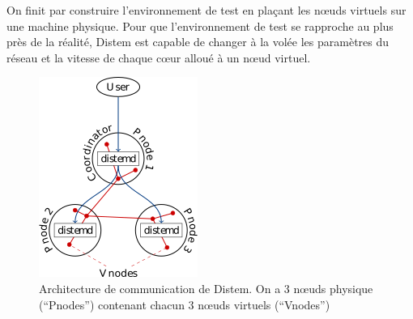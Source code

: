 On finit par construire l'environnement de test en plaçant les n\oe uds virtuels sur une machine physique. Pour que l'environnement de test se rapproche au plus près de la réalité, Distem est capable de changer à la volée les paramètres du réseau et la vitesse de chaque c\oe ur alloué à un n\oe ud virtuel.

\begin{figure}
  \centering
  \includegraphics{Pictures/png/Distem_architecture}
  \caption{Architecture de communication de Distem. On a 3 n\oe uds physique (``Pnodes'') contenant chacun 3 n\oe uds virtuels (``Vnodes'')}
  \label{Distem_archi}
\end{figure}

